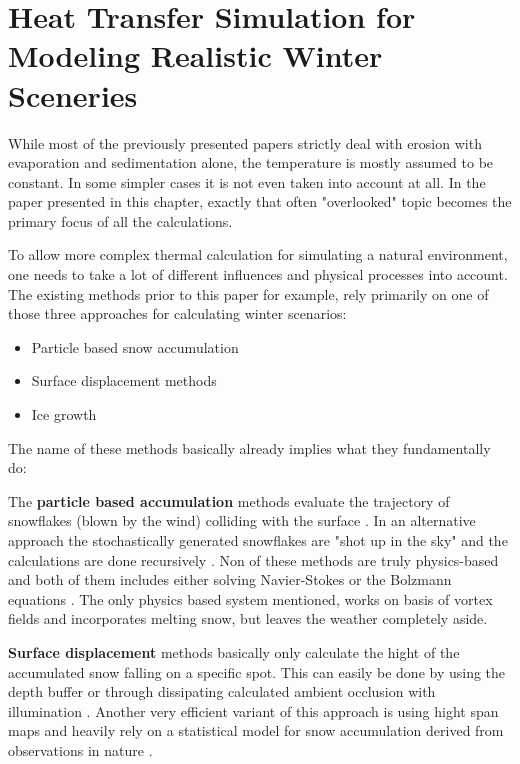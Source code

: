 \section{Heat Transfer Simulation for Modeling Realistic Winter Sceneries}

While most of the previously presented papers strictly deal with erosion with evaporation and sedimentation alone, the temperature is mostly assumed to be constant. In some simpler cases it is not even taken into account at all. In the paper \cite{benes2001layered} presented in this chapter, exactly that often "overlooked" topic becomes the primary focus of all the calculations.

To allow more complex thermal calculation for simulating a natural environment, one needs to take a lot of different influences and physical processes into account. The existing methods prior to this paper for example, rely primarily on one of those three approaches for calculating winter scenarios:
\begin{itemize}
	\item Particle based snow accumulation
	\item Surface displacement methods
	\item Ice growth
\end{itemize}

The name of these methods basically already implies what they fundamentally do:

The \textbf{particle based accumulation} methods evaluate the trajectory of snowflakes (blown by the wind) colliding with the surface \cite{nishita1997modeling}. In an alternative approach the stochastically generated snowflakes are "shot up in the sky" and the calculations are done recursively \cite{fearing2000computer}. Non of these methods are truly physics-based and both of them includes either solving Navier-Stokes \cite{feldman2002modeling} or the Bolzmann equations \cite{wang2006real}. The only physics based system mentioned, works on basis of vortex fields and incorporates melting snow, but leaves the weather completely aside.

\textbf{Surface displacement} methods basically only calculate the hight of the accumulated snow falling on a specific spot. This can easily be done by using the depth buffer \cite{ohlsson2004real} or through dissipating calculated ambient occlusion with illumination \cite{foldes2007occlusion}. Another very efficient variant of this approach is using hight span maps and heavily rely on a statistical model for snow accumulation derived from observations in nature \cite{haglund2002snow} \cite{festenberg2009geometric}.

